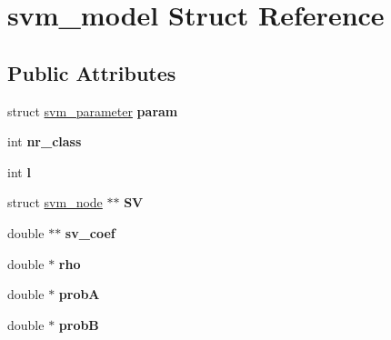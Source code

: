 \hypertarget{structsvm__model}{
\section{svm\_\-model Struct Reference}
\label{structsvm__model}
}
\subsection*{Public Attributes}
\begin{DoxyCompactItemize}
\item 
\hypertarget{structsvm__model_a95f43f398a173e63d0ce26911d0a9273}{
struct \hyperlink{structsvm__parameter}{svm\_\-parameter} {\bfseries param}}
\label{structsvm__model_a95f43f398a173e63d0ce26911d0a9273}

\item 
\hypertarget{structsvm__model_a5af6e0cfb063e8aac03c99aa9d319116}{
int {\bfseries nr\_\-class}}
\label{structsvm__model_a5af6e0cfb063e8aac03c99aa9d319116}

\item 
\hypertarget{structsvm__model_ab858d7eed0bd3cc4c33c094872643d0a}{
int {\bfseries l}}
\label{structsvm__model_ab858d7eed0bd3cc4c33c094872643d0a}

\item 
\hypertarget{structsvm__model_ac518bb02802bd8d04155a46fb24f5c76}{
struct \hyperlink{structsvm__node}{svm\_\-node} $\ast$$\ast$ {\bfseries SV}}
\label{structsvm__model_ac518bb02802bd8d04155a46fb24f5c76}

\item 
\hypertarget{structsvm__model_ae3c6741e1a310e59976b31c531f949f9}{
double $\ast$$\ast$ {\bfseries sv\_\-coef}}
\label{structsvm__model_ae3c6741e1a310e59976b31c531f949f9}

\item 
\hypertarget{structsvm__model_aa7c0e091e23bdc965fd668461d5f5ba8}{
double $\ast$ {\bfseries rho}}
\label{structsvm__model_aa7c0e091e23bdc965fd668461d5f5ba8}

\item 
\hypertarget{structsvm__model_a55da9b9656c38fff337e4dd842c9699d}{
double $\ast$ {\bfseries probA}}
\label{structsvm__model_a55da9b9656c38fff337e4dd842c9699d}

\item 
\hypertarget{structsvm__model_a48e7f3afe25ff2779ee8dc1f992d11b1}{
double $\ast$ {\bfseries probB}}
\label{structsvm__model_a48e7f3afe25ff2779ee8dc1f992d11b1}


\end{DoxyCompactItemize}
